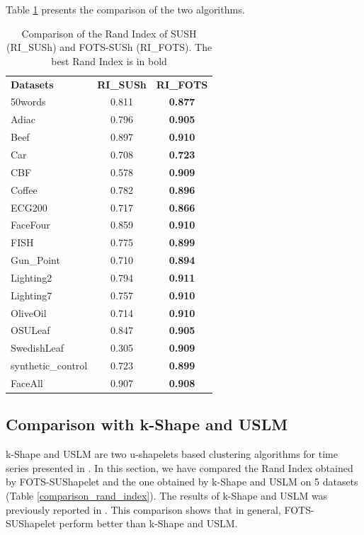 Table \ref{ri} presents the comparison of the two algorithms.

\begin{table}[ht]
\centering
\begin{tabular}{lcc}
\textbf{Datasets}  & \textbf{RI\_SUSh} & \textbf{RI\_FOTS} \\
50words            & 0.811             & \textbf{0.877}    \\
Adiac              & 0.796             & \textbf{0.905}    \\
Beef               & 0.897             & \textbf{0.910}    \\
Car                & 0.708             & \textbf{0.723}    \\
CBF                & 0.578             & \textbf{0.909}    \\
Coffee             & 0.782             & \textbf{0.896}    \\
ECG200             & 0.717             & \textbf{0.866}    \\
FaceFour           & 0.859             & \textbf{0.910}    \\
FISH               & 0.775             & \textbf{0.899}    \\
Gun\_Point         & 0.710             & \textbf{0.894}    \\
Lighting2          & 0.794             & \textbf{0.911}    \\
Lighting7          & 0.757             & \textbf{0.910}    \\
OliveOil           & 0.714             & \textbf{0.910}    \\
OSULeaf            & 0.847             & \textbf{0.905}    \\
SwedishLeaf        & 0.305             & \textbf{0.909}    \\
synthetic\_control & 0.723             & \textbf{0.899}    \\
FaceAll            & 0.907             & \textbf{0.908}   
\end{tabular}
\caption{Comparison of the Rand Index of SUSH (RI\_SUSh) and FOTS-SUSh (RI\_FOTS). The best Rand Index is in bold}
\label{ri}
\end{table}

\subsection{Comparison with k-Shape and USLM}

k-Shape and USLM are two u-shapelets  based clustering algorithms for time series presented in \cite{zhang2016unsupervised}. In this section, we have compared the Rand Index obtained by FOTS-SUShapelet and the one obtained by k-Shape and USLM on 5 datasets (Table \ref{comparison_rand_index}). The results of k-Shape and USLM was previously reported in \cite{zhang2016unsupervised}. This comparison shows that in general, FOTS-SUShapelet perform better than k-Shape and USLM.

